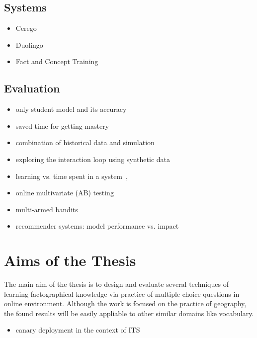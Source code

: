 \documentclass[table,color]{fithesis3/fithesis3}
\begin{document}
\section{Systems}

\begin{itemize}
	\item Cerego
	\item Duolingo~\cite{von2013duolingo, garcia2013learning}
	\item Fact and Concept Training~\cite{pavlik2007fact,pavlik2008using}
\end{itemize}

\section{Evaluation}

\begin{itemize}
	\item only student model and its accuracy~\cite{pelanek2014brief}
	\item saved time for getting mastery~\cite{yudelson2015small}
	\item combination of historical data and simulation~\cite{gonzalez2015your}
	\item exploring the interaction loop using synthetic data~\cite{niznan2015exploring}
	\item learning vs. time spent in a system~\cite{lomas2013optimizing, monterrat2015player},
	\item online multivariate (AB) testing~\cite{lomas2013optimizing,liu2014towards,stamper2012rise}
	\item multi-armed bandits~\cite{liu2014trading,lopes2015multi}
	\item recommender systems: model performance vs. impact~\cite{cremonesi2010performance}
\end{itemize}

\chapter{Aims of the Thesis}

The main aim of the thesis is to design and evaluate several techniques of
learning factographical knowledge via practice of multiple choice questions in
online environment. Although the work is focused on the practice of geography,
the found results will be easily appliable to other similar domains like
vocabulary.

\begin{itemize}
	\item canary deployment in the context of ITS
\end{itemize}
\end{document}
